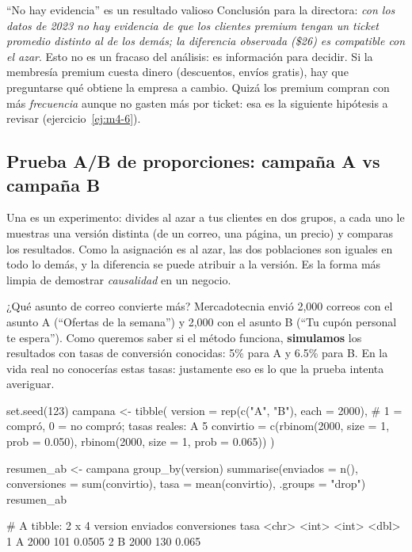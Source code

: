 \begin{negocio}{``No hay evidencia'' es un resultado valioso}
Conclusión para la directora: \emph{con los datos de 2023 no hay evidencia
de que los clientes premium tengan un ticket promedio distinto al de los
demás; la diferencia observada (\$26) es compatible con el azar}. Esto no es
un fracaso del análisis: es información para decidir. Si la membresía premium
cuesta dinero (descuentos, envíos gratis), hay que preguntarse qué obtiene
la empresa a cambio. Quizá los premium compran con más \emph{frecuencia}
aunque no gasten más por ticket: esa es la siguiente hipótesis a revisar
(ejercicio~\ref{ej:m4-6}).
\end{negocio}

\subsection{Prueba A/B de proporciones: campaña A vs campaña B}
\label{sec:m4-ab}

Una  es un experimento: divides al azar a tus clientes en
dos grupos, a cada uno le muestras una versión distinta (de un correo, una
página, un precio) y comparas los resultados. Como la asignación es al azar,
las dos poblaciones son iguales en todo lo demás, y la diferencia se puede
atribuir a la versión. Es la forma más limpia de demostrar
\emph{causalidad} en un negocio.

\begin{ejemplo}{¿Qué asunto de correo convierte más?}
Mercadotecnia envió 2,000 correos con el asunto A (``Ofertas de la
semana'') y 2,000 con el asunto B (``Tu cupón personal te espera''). Como
queremos saber si el método funciona, \textbf{simulamos} los resultados con
tasas de conversión conocidas: 5\% para A y 6.5\% para B. En la vida real no
conocerías estas tasas: justamente eso es lo que la prueba intenta
averiguar.
\end{ejemplo}

\begin{rcode}
set.seed(123)
campana <- tibble(
  version  = rep(c("A", "B"), each = 2000),
  # 1 = compró, 0 = no compró; tasas reales: A 5%
  convirtio = c(rbinom(2000, size = 1, prob = 0.050),
                rbinom(2000, size = 1, prob = 0.065))
)

resumen_ab <- campana %
  group_by(version) %
  summarise(enviados    = n(),
            conversiones = sum(convirtio),
            tasa        = mean(convirtio),
            .groups = "drop")
resumen_ab
\end{rcode}
\begin{rsalida}
# A tibble: 2 x 4
  version enviados conversiones   tasa
  <chr>      <int>        <int>  <dbl>
1 A           2000          101 0.0505
2 B           2000          130 0.065
\end{rsalida}

